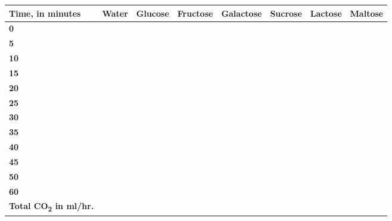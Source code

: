 \documentclass[
  letterpaper,
  DIV=11,
  numbers=noendperiod]{scrreprt}
\newcounter{none} %
\begin{document}
{\def\LTcaptype{none} %
\begin{longtable}[]{@{}
  >{\centering\arraybackslash}p{}
  >{\raggedright\arraybackslash}p{}
  >{\raggedright\arraybackslash}p{}
  >{\raggedright\arraybackslash}p{}
  >{\raggedright\arraybackslash}p{}
  >{\raggedright\arraybackslash}p{}
  >{\raggedright\arraybackslash}p{}
  >{\raggedright\arraybackslash}p{}@{}}
\toprule\noalign{}
\begin{minipage}[b]{\linewidth}\centering
\textbf{Time, in minutes}
\end{minipage} & \begin{minipage}[b]{\linewidth}\raggedright
\textbf{Water}
\end{minipage} & \begin{minipage}[b]{\linewidth}\raggedright
\textbf{Glucose}
\end{minipage} & \begin{minipage}[b]{\linewidth}\raggedright
\textbf{Fructose}
\end{minipage} & \begin{minipage}[b]{\linewidth}\raggedright
\textbf{Galactose}
\end{minipage} & \begin{minipage}[b]{\linewidth}\raggedright
\textbf{Sucrose}
\end{minipage} & \begin{minipage}[b]{\linewidth}\raggedright
\textbf{Lactose}
\end{minipage} & \begin{minipage}[b]{\linewidth}\raggedright
\textbf{Maltose}
\end{minipage} \\
\midrule\noalign{}
\endhead
\bottomrule\noalign{}
\endlastfoot
\textbf{0} & & & & & & & \\
\textbf{5} & & & & & & & \\
\textbf{10} & & & & & & & \\
\textbf{15} & & & & & & & \\
\textbf{20} & & & & & & & \\
\textbf{25} & & & & & & & \\
\textbf{30} & & & & & & & \\
\textbf{35} & & & & & & & \\
\textbf{40} & & & & & & & \\
\textbf{45} & & & & & & & \\
\textbf{50} & & & & & & & \\
\textbf{60} & & & & & & & \\
\textbf{Total CO\textsubscript{2} in ml/hr.} & & & & & & & \\
\end{longtable}
}
\end{document}
